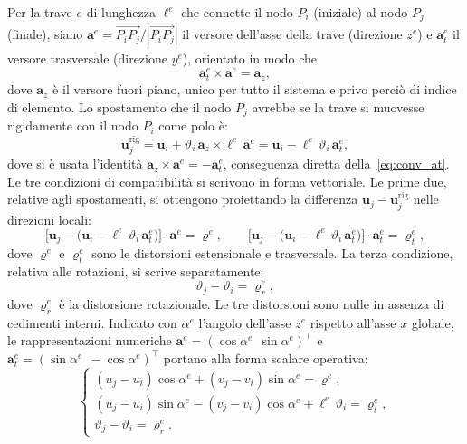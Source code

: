 \medskip
Per la trave $e$ di lunghezza $\ell^e$ che connette il
nodo $P_i$ (iniziale) al nodo $P_j$ (finale), siano
$\mathbf{a}^e = \overrightarrow{P_iP_j}/|\overrightarrow{P_iP_j}|$
il versore dell'asse della trave (direzione $z^e$) e
$\mathbf{a}^e_t$ il versore trasversale (direzione $y^e$),
orientato in modo che
\begin{equation}\label{eq:conv_at}
	\mathbf{a}^e_t \times \mathbf{a}^e = \mathbf{a}_z,
\end{equation}
dove $\mathbf{a}_z$ è il versore fuori piano, unico per
tutto il sistema e privo perciò di indice di elemento.
Lo spostamento che il nodo $P_j$ avrebbe se la trave si
muovesse rigidamente con il nodo $P_i$ come polo è:
\begin{equation}\label{eq:spost_rigido_polo}
	\mathbf{u}_{j}^{\text{rig}}
	= \mathbf{u}_i + \vartheta_i\,\mathbf{a}_z \times \ell^e\,\mathbf{a}^e
	= \mathbf{u}_i - \ell^e\,\vartheta_i\,\mathbf{a}^e_t,
\end{equation}
dove si è usata l'identità
$\mathbf{a}_z \times \mathbf{a}^e = -\mathbf{a}^e_t$,
conseguenza diretta della~\eqref{eq:conv_at}.
Le tre condizioni di compatibilità si scrivono in forma
vettoriale. Le prime due, relative agli spostamenti,
si ottengono proiettando la differenza
$\mathbf{u}_j - \mathbf{u}_{j}^{\text{rig}}$ nelle direzioni locali:
\begin{equation}\label{eq:compat_vettoriale_trasl}
	\bigl[\mathbf{u}_j -
	\bigl(\mathbf{u}_i - \ell^e\,\vartheta_i\,\mathbf{a}^e_t\bigr)
	\bigr] \cdot \mathbf{a}^e = \varrho^e,
	\qquad
	\bigl[\mathbf{u}_j -
	\bigl(\mathbf{u}_i - \ell^e\,\vartheta_i\,\mathbf{a}^e_t\bigr)
	\bigr] \cdot \mathbf{a}^e_t = \varrho^e_t,
\end{equation}
dove $\varrho^e$ e $\varrho^e_t$ sono le distorsioni
estensionale e trasversale. La terza condizione,
relativa alle rotazioni, si scrive separatamente:
\begin{equation}\label{eq:compat_rot}
	\vartheta_j - \vartheta_i = \varrho^e_r,
\end{equation}
dove $\varrho^e_r$ è la distorsione rotazionale.
Le tre distorsioni sono nulle in assenza di cedimenti interni.
Indicato con $\alpha^e$ l'angolo dell'asse $z^e$ rispetto
all'asse $x$ globale, le rappresentazioni numeriche
$\bm{a}^e = (\cos\alpha^e\,\;\sin\alpha^e)^\top$ e
$\bm{a}^e_t = (\sin\alpha^e\,\;-\cos\alpha^e)^\top$
portano alla forma scalare operativa:
\begin{equation}\label{eq:compat_globale_telaio}
	\begin{cases}
		(u_j - u_i)\cos\alpha^e +
		(v_j - v_i)\sin\alpha^e
		= \varrho^e, \\[6pt]
		(u_j - u_i)\sin\alpha^e -
		(v_j - v_i)\cos\alpha^e
		+ \ell^e\,\vartheta_i
		= \varrho^e_t, \\[6pt]
		\vartheta_j - \vartheta_i
		= \varrho^e_r.
	\end{cases}
\end{equation}



